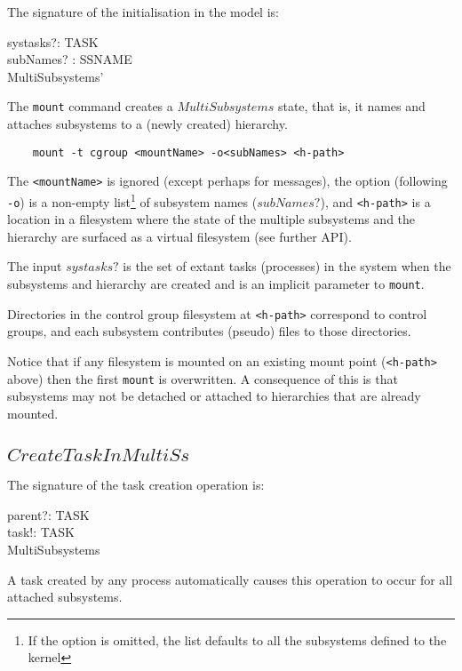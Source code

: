 \documentclass[a4paper,twoside,12pt]{article}
\begin{document}
The signature of the initialisation in the model is:

\begin{schema*}
    systasks?: \finset TASK \\
    subNames? : \finset SSNAME \\
\also
  MultiSubsystems'
\end{schema*}
The \texttt{mount} command creates a $MultiSubsystems$ state, that is, it names and attaches subsystems to a 
(newly created) hierarchy.

\begin{verbatim}
    mount -t cgroup <mountName> -o<subNames> <h-path>
\end{verbatim}
The \texttt{<mountName>} is ignored (except perhaps for messages), 
the option (following \texttt{-o}) is a non-empty list\footnote{If the option is omitted, the list defaults to all the subsystems defined to the kernel} of subsystem names
($subNames?$), and \texttt{<h-path>} is a location in a filesystem
where the state of the multiple subsystems and the hierarchy are surfaced as a virtual filesystem (see further API).

The input $systasks?$ is the set of extant tasks (processes) in the system when the subsystems and hierarchy
are created and is an implicit parameter to \texttt{mount}.

Directories in the control group filesystem at \texttt{<h-path>} correspond to control groups, 
and each subsystem contributes
(pseudo) files to those directories.

Notice that if any filesystem is mounted on an existing mount point (\texttt{<h-path>} above) then the first 
\texttt{mount} is overwritten.
A consequence of this is that subsystems may not be detached or attached to hierarchies that are already mounted.

\subsection{$CreateTaskInMultiSs$}

The signature of the task creation operation is:
\begin{schema*}
    parent?: TASK \\
    task!: TASK \\
\also
    \Delta MultiSubsystems
\end{schema*}
A task created by any process automatically causes this operation to occur for all attached subsystems.
\end{document}
